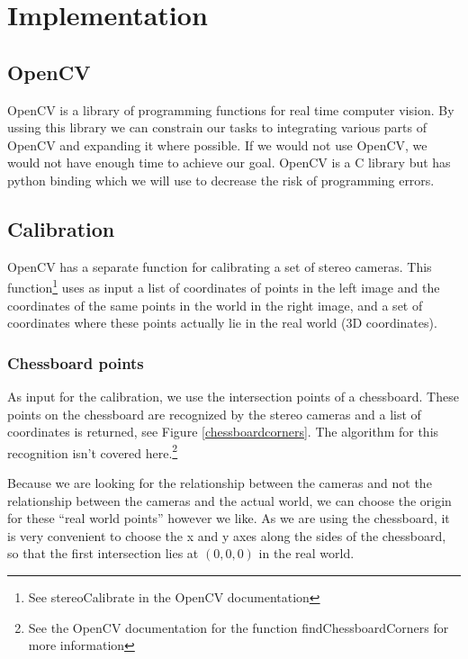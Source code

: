 \documentclass[a4paper]{article}
\begin{document}
\section{Implementation}

\subsection{OpenCV}
\label{opencv} OpenCV is a library of programming functions for real
time computer vision. By ussing this library we can constrain our tasks
to integrating various parts of OpenCV and expanding it where
possible. If we would not use OpenCV, we would not have enough time to
achieve our goal. OpenCV is a C library but has python binding which
we will use to decrease the risk of programming errors.

\subsection{Calibration}
\label{calib_implement} OpenCV has a separate function for calibrating
a set of stereo cameras. This function\footnote{See stereoCalibrate in
the OpenCV documentation} uses as input a list of coordinates of
points in the left image and the coordinates of the same points in the
world in the right image, and a set of coordinates where these points
actually lie in the real world (3D coordinates).

\subsubsection{Chessboard points} As input for the calibration, we use
the intersection points of a chessboard. These points on the
chessboard are recognized by the stereo cameras and a list of
coordinates is returned, see Figure \ref{chessboardcorners}. The
algorithm for this recognition isn't covered here.\footnote{See the
OpenCV documentation for the function findChessboardCorners for more
information}

Because we are looking for the relationship between the cameras and
not the relationship between the cameras and the actual world, we can
choose the origin for these ``real world points'' however we like. As
we are using the chessboard, it is very convenient to choose the x and
y axes along the sides of the chessboard, so that the first
intersection lies at $(0, 0, 0)$ in the real world.
\end{document}
